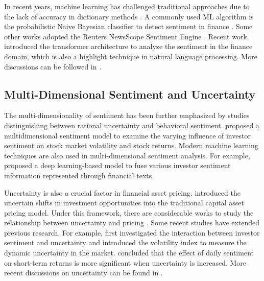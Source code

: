 \documentclass[preprint,12pt,authoryear]{elsarticle}
\begin{document}
In recent years, machine learning has challenged traditional approaches due to the lack of accuracy in dictionary methods \citep{guo2016textual,renault2017intraday,mcgurk2020stock}. A commonly used ML algorithm is the probabilistic Naive Bayesian classifier to detect sentiment in finance \citep{antweiler2004all,li2010information,sprenger2014tweets}. Some other works adopted the Reuters NewsScope Sentiment Engine \citep{gross2011machines,sun2016stock,audrino2019sentiment}. Recent work introduced the transformer architecture \citep{sun2019fine,hiew2019bert,huang2023finbert,lopez2023can,touvron2023llama} to analyze the sentiment in the finance domain, which is also a highlight technique in natural language processing. More discussions can be followed in \citet{todd2024text}.

\subsection{Multi-Dimensional Sentiment and Uncertainty}

The multi-dimensionality of sentiment has been further emphasized by studies distinguishing between rational uncertainty and behavioral sentiment. 
\citet{saravanaraj2025sentimental,kang2025multidimensional,eckhaus2026data} proposed a multidimensional sentiment model to examine the varying influence of investor sentiment on stock market volatility and stock returns. Modern machine learning techniques are also used in multi-dimensional sentiment analysis. For example, \citet{wang2025deep} proposed a deep learning-based model to fuse various investor sentiment information represented through financial texts. 

Uncertainty is also a crucial factor in financial asset pricing. \citet{merton1973intertemporal} introduced the uncertain shifts in investment opportunities into the traditional capital asset pricing model. Under this framework, there are considerable works to study the relationship between uncertainty and pricing \citep{rigotti2005uncertainty,jiang2005information,zhang2006information,arnold2008fundamental,dash2021economic,asgharian2023effect}. Some recent studies have extended previous research. For example, \cite{birru2022sentiment} first investigated the interaction between investor sentiment and uncertainty and introduced the volatility index to measure the dynamic uncertainty in the market. \cite{seok2024dual} concluded that the effect of daily sentiment on short-term returns is more significant when uncertainty is increased. More recent discussions on uncertainty can be found in \citet{arnold2010treasury,segal2015good,manela2017news}.
\end{document}

